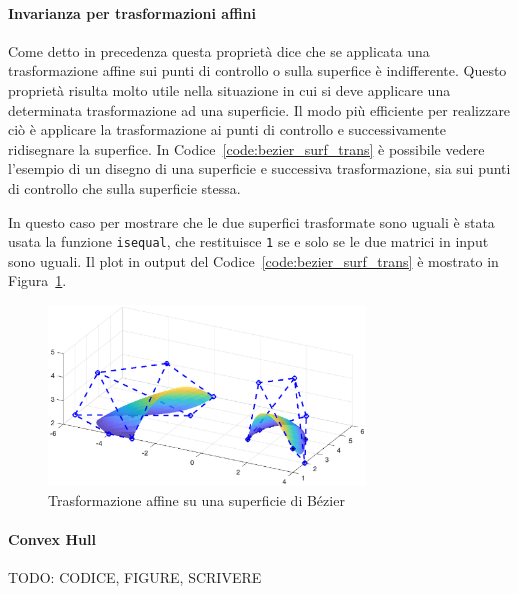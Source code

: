 \documentclass[a4paper, 10pt]{article}
\begin{document}
  \paragraph{Invarianza per trasformazioni affini}
  Come detto in precedenza questa proprietà dice che se applicata una trasformazione affine sui punti di controllo o sulla superfice è indifferente. 
  Questo proprietà risulta molto utile nella situazione in cui si deve applicare una determinata trasformazione ad una superficie. Il modo 
  più efficiente per realizzare ciò è applicare la trasformazione ai punti di controllo e successivamente ridisegnare la superfice.
  In Codice~\ref{code:bezier_surf_trans} è possibile vedere l'esempio di un disegno di una superficie e successiva trasformazione,
  sia sui punti di controllo che sulla superficie stessa.
  
  In questo caso per mostrare che le due superfici trasformate sono uguali è stata usata la funzione \texttt{isequal}, che restituisce \texttt{1} se e solo se 
  le due matrici in input sono uguali. Il plot in output del Codice~\ref{code:bezier_surf_trans} è mostrato in Figura~\ref{fig:bezier_surf_trans}.
  \begin{figure}[]
    \centering
    \includegraphics[width=0.75\textwidth]{figure/bezier_surf_trans.eps}
    \caption{Trasformazione affine su una superficie di Bézier}
    \label{fig:bezier_surf_trans}
  \end{figure} 
  \paragraph{Convex Hull} TODO: CODICE, FIGURE, SCRIVERE
\end{document}
